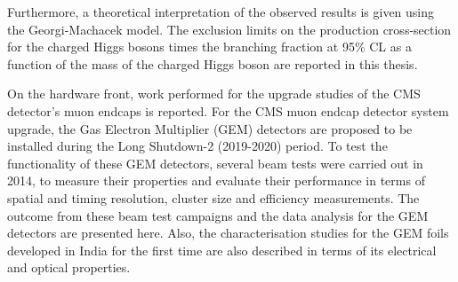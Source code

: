 Furthermore, a theoretical interpretation of the observed results is given using the Georgi-Machacek model. The exclusion limits on the production cross-section for the charged Higgs bosons times the branching fraction at 95\% CL as a function of the mass of the charged Higgs boson are reported in this thesis.

On the hardware front, work performed for the upgrade studies of the CMS detector's muon endcaps is reported. For the CMS muon endcap detector system upgrade, the Gas Electron Multiplier (GEM) detectors are proposed to be installed during the Long Shutdown-2 (2019-2020) period. To test the functionality of these GEM detectors, several beam tests were carried out in 2014, to measure their properties and evaluate their performance in terms of spatial and timing resolution, cluster size and efficiency measurements. The outcome from these beam test campaigns and the data analysis for the GEM detectors are presented here. Also, the characterisation studies for the GEM foils developed in India for the first time are also described in terms of its electrical and optical properties.
